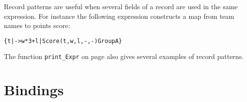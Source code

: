\documentclass[\pformat,12pt]{article}
\begin{document}
\begin{description}
Record patterns are useful when several fields of a record are used in
the same expression. For instance the following expression constructs
a map from team names to points score:
\begin{alltt}
  \{ t |-> w * 3 + l | Score(t,w,l,-,-)  GroupA\}
\end{alltt}
The function \texttt{print\_Expr} on page \pageref{printExprDef} also gives
several examples of record patterns.




\end{description}

\section{Bindings}\label{bind}
\end{document}
